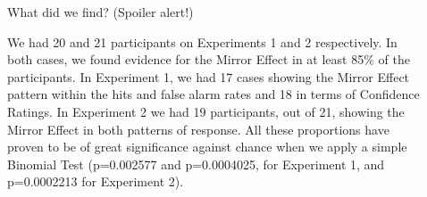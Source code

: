 \documentclass[final]{beamer}
\newlength{\sepwid}
\newlength{\onecolwid}
\newlength{\twocolwid}
\begin{document}
\begin{frame}[t]
\begin{columns}[t]
\begin{column}{\onecolwid}

\end{column} %

\begin{column}{\sepwid}\end{column} %

\begin{column}{\twocolwid} %



\begin{alertblock}{What did we find? (Spoiler alert!)}

We had 20 and 21 participants on Experiments 1 and 2 respectively. In both cases, we found evidence for the Mirror Effect in at least 85\% of the participants. In Experiment 1, we had 17 cases showing the Mirror Effect pattern within the hits and false alarm rates and 18 in terms of Confidence Ratings. In Experiment 2 we had 19 participants, out of 21, showing the Mirror Effect in both patterns of response. All these proportions have proven to be of great significance against chance when we apply a simple Binomial Test (p=0.002577 and p=0.0004025, for Experiment 1, and p=0.0002213 for Experiment 2).

\end{alertblock} 

\begin{columns}[t,totalwidth=\twocolwid] %
\begin{column}{\onecolwid}\vspace{-.6in} %














\end{column}
\end{columns}
\end{column}
\end{columns}
\end{frame}
\end{document}
